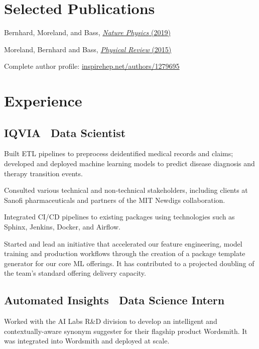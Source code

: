 \documentclass[letterpaper,10pt]{article}
\begin{document}
\begin{multicols}{2}
\section{Selected Publications}
\smallskip

Bernhard, Moreland, and Bass,
\href{https://www.nature.com/articles/s41567-019-0611-8}{\emph{Nature Physics} (2019)}

Moreland, Bernhard and Bass,
\href{https://arxiv.org/abs/1412.4708}{\emph{Physical Review} (2015)}

Complete author profile:
\href{https://inspirehep.net/authors/1279695}{inspirehep.net/authors/1279695}

\columnbreak

\section{Experience}

\subsection{IQVIA \textbar\ Data Scientist}

Built ETL pipelines to preprocess deidentified medical records and claims;
developed and deployed machine learning models to predict disease diagnosis and
therapy transition events.

Consulted various technical and non-technical stakeholders, including clients
at Sanofi pharmaceuticals and partners of the MIT Newdigs collaboration.

Integrated CI/CD pipelines to existing packages using technologies such as
Sphinx, Jenkins, Docker, and Airflow.

Started and lead an initiative that accelerated our feature engineering, model
training and production workflows through the creation of a package template
generator for our core ML offerings. It has contributed to a projected doubling
of the team's standard offering delivery capacity.\smallskip

\subsection{Automated Insights \textbar\ Data Science Intern}

Worked with the AI Labs R\&D division to develop an intelligent and
contextually-aware synonym suggester for their flagship product Wordsmith.
It was integrated into Wordsmith and deployed at scale.\smallskip


\end{multicols}
\end{document}
